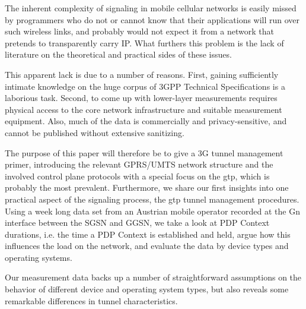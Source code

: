 
The inherent complexity of signaling in mobile cellular networks is easily missed by programmers who do not or cannot know that their applications will run over such wireless links, and probably would not expect it from a network that pretends to transparently carry IP. What furthers this problem is the lack of literature on the theoretical and practical sides of these issues.

This apparent lack is due to a number of reasons. First, gaining sufficiently intimate knowledge on the huge corpus of \gls{3GPP} Technical Specifications %
is a laborious task. Second, to come up with lower-layer measurements requires physical access to the core network infrastructure and suitable measurement equipment. Also, much of the data is commercially and privacy-sensitive, and cannot be published without extensive sanitizing.

The purpose of this paper will therefore be to give a 3G tunnel management primer, introducing the relevant \acrshort{GPRS}/\acrshort{UMTS} network structure and the involved control plane protocols with a special focus on the \gls{gtp}, which is probably the most prevalent. %
Furthermore, we share our first insights into one practical aspect of the signaling process, the \gls{gtp} tunnel management procedures. Using a week long data set from an Austrian mobile operator recorded at the Gn interface between the \gls{SGSN} and \gls{GGSN}, %
we take a look at \gls{PDP} Context durations, i.e. the time a \gls{PDP} Context is established and held, argue how this influences the load on the network, and evaluate the data by device types and operating systems.

Our measurement data backs up a number of straightforward assumptions on the behavior of different device and operating system types, but also reveals some remarkable differences in tunnel characteristics.\\









